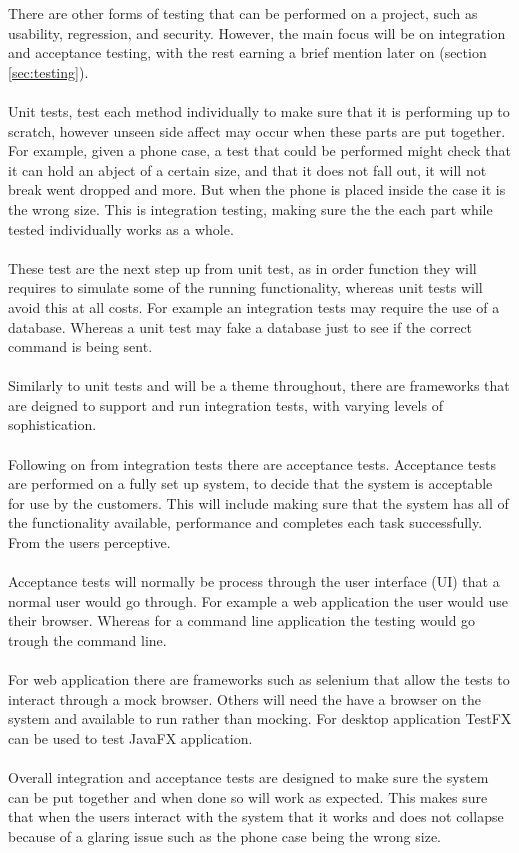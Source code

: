 There are other forms of testing that can be performed on a project, such as usability, regression,  and security. However, the main focus will be on integration and acceptance testing, with the rest earning a brief mention later on (section \ref{sec:testing}). 
\\\\
Unit tests, test each method individually to make sure that it is performing up to scratch, however unseen side affect may occur when these parts are put together. For example, given a phone case, a test that could be performed might check that it can hold an abject of a certain size, and that it does not fall out, it will not break went dropped and more. But when the phone is placed inside the case it is the wrong size. This is integration testing, making sure the the each part while tested individually works as a whole.
\\\\
These test are the next step up from unit test, as in order function they will requires to simulate some of the running functionality, whereas unit tests will avoid this at all costs. For example an integration tests may require the use of a database. Whereas a unit test may fake a database just to see if the correct command is being sent.
\\\\ 
Similarly to unit tests and will be a theme throughout, there are frameworks that are deigned to support and run integration tests, with varying levels of sophistication.
\\\\
Following on from integration tests there are acceptance tests. Acceptance tests are performed on a fully set up system, to decide that the system is acceptable for use by the customers. This will include making sure that the system has all of the functionality available, performance and completes each task successfully. From the users perceptive.
\\\\
Acceptance tests will normally be process through the user interface (UI) that a normal user would go through. For example a web application the user would use their browser. Whereas for a command line application the testing would go trough the command line.
\\\\
For web application there are frameworks such as selenium that allow the tests to interact through a mock browser. Others will need the have a browser on the system and available to run rather than mocking. For desktop application TestFX can be used to test JavaFX application.
\\\\
Overall integration and acceptance tests are designed to make sure the system can be put together and when done so will work as expected. This makes sure that when the users interact with the system that it works and does not collapse because of a glaring issue such as the phone case being the wrong size.

